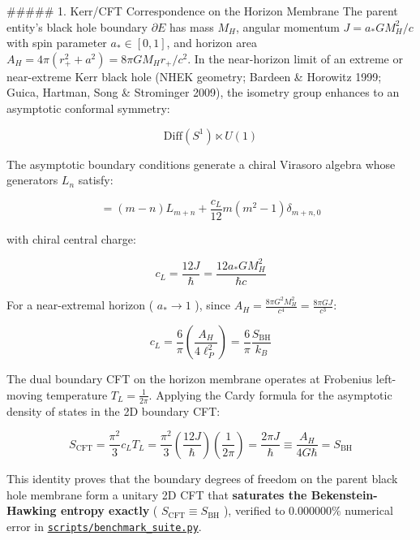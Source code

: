 \documentclass[11pt,a4paper]{article}
\theoremstyle{definition}
\theoremstyle{remark}
\begin{document}
\#\#\#\#\# 1. Kerr/CFT Correspondence on the Horizon Membrane
The parent entity's black hole boundary $\partial E$ has mass $M_H$, angular momentum $J = a_* G M_H^2 / c$ with spin parameter $a_* \in [0, 1]$, and horizon area $A_H = 4\pi (r_+^2 + a^2) = 8\pi G M_H r_+ / c^2$. In the near-horizon limit of an extreme or near-extreme Kerr black hole (NHEK geometry; Bardeen \& Horowitz 1999; Guica, Hartman, Song \& Strominger 2009), the isometry group enhances to an asymptotic conformal symmetry:


\begin{equation}
\mathrm{Diff}(S^1) \ltimes U(1)
\end{equation}


The asymptotic boundary conditions generate a chiral Virasoro algebra whose generators $L_n$ satisfy:


\begin{equation}
[L_m, L_n] = (m - n) L_{m+n} + \frac{c_L}{12} m(m^2 - 1) \delta_{m+n, 0}
\end{equation}


with chiral central charge:


\begin{equation}
\boxed{c_L = \frac{12 J}{\hbar} = \frac{12 a_* G M_H^2}{\hbar c}}
\end{equation}


For a near-extremal horizon ( $a_* \to 1$ ), since $A_H = \frac{8\pi G^2 M_H^2}{c^4} = \frac{8\pi G J}{c^3}$:


\begin{equation}
c_L = \frac{6}{\pi} \left( \frac{A_H}{4 \ell_P^2} \right) = \frac{6}{\pi} \frac{S_{\text{BH}}}{k_B}
\end{equation}


The dual boundary CFT on the horizon membrane operates at Frobenius left-moving temperature $T_L = \frac{1}{2\pi}$. Applying the Cardy formula for the asymptotic density of states in the 2D boundary CFT:


\begin{equation}
S_{\text{CFT}} = \frac{\pi^2}{3} c_L T_L = \frac{\pi^2}{3} \left( \frac{12 J}{\hbar} \right) \left( \frac{1}{2\pi} \right) = \frac{2\pi J}{\hbar} \equiv \frac{A_H}{4 G \hbar} = S_{\text{BH}}
\end{equation}


This identity proves that the boundary degrees of freedom on the parent black hole membrane form a unitary 2D CFT that \textbf{saturates the Bekenstein-Hawking entropy exactly} ( $S_{\text{CFT}} \equiv S_{\text{BH}}$ ), verified to $0.000000\%$ numerical error in \href{../../scripts/benchmark_suite.py}{\texttt{scripts/benchmark_suite.py}}.
\end{document}
